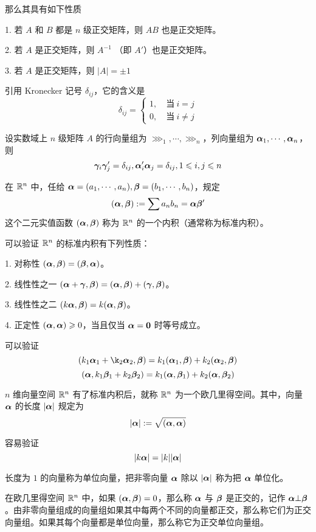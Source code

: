 那么其具有如下性质

1. 若 $A$ 和  $B$ 都是 $n$ 级正交矩阵，则 $AB$ 也是正交矩阵。

2. 若 $A$ 是正交矩阵，则 $A^{-1}$ （即 $A'$）也是正交矩阵。

3. 若 $A$ 是正交矩阵，则 $|A|=\pm 1$


引用 Kronecker 记号 $\delta_{ij}$，它的含义是
$$\delta_{ij}=\begin{cases}
    1,\quad \text{当}\ i=j\\
    0,\quad \text{当}\ i\ne j
\end{cases}$$

\begin{theorem}
    设实数域上 $n$ 级矩阵 $A$ 的行向量组为 $\ggg_1,\cdots,\ggg_n$，列向量组为 $\aaa_1,\cdots,\aaa_n$，则
    $$\ggg_i\ggg_j'=\delta_{ij},\aaa_i'\aaa_j=\delta_{ij},1 \leqslant i,j \leqslant n$$
\end{theorem}

\begin{definition}
    在 $\RR^n$ 中，任给 $\aaa = (a_1,\cdots,a_n),\bbb=(b_1,\cdots,b_n)$，规定
    $$(\aaa,\bbb) := \sum a_nb_n = \aaa\bbb'$$
    这个二元实值函数 $(\aaa,\bbb)$ 称为 $\RR^n$ 的一个内积（通常称为标准内积）。
\end{definition}

可以验证 $\RR^n$ 的标准内积有下列性质：

1. 对称性 $(\aaa,\bbb) = (\bbb,\aaa)$。

2. 线性性之一 $(\aaa+\ggg,\bbb) = (\aaa,\bbb) + (\ggg,\bbb)$。

3. 线性性之二 $(k\aaa,\bbb) = k(\aaa,\bbb)$。

4. 正定性 $(\aaa,\aaa)\geqslant 0$，当且仅当 $\aaa=\ling$ 时等号成立。

可以验证
$$(k_1\aaa_1+\k_2\aaa_2,\bbb) = k_1(\aaa_1,\bbb) + k_2(\aaa_2,\bbb)$$
$$(\aaa,k_1\bbb_1+k_2\bbb_2) = k_1(\aaa,\bbb_1) + k_2(\aaa,\bbb_2)$$

$n$ 维向量空间 $\RR^n$ 有了标准内积后，就称 $\RR^n$ 为一个欧几里得空间。其中，向量 $\aaa$ 的长度 $|\aaa|$ 规定为
$$|\aaa| := \sqrt{(\aaa,\aaa)}$$

容易验证
$$|k\aaa| = |k||\aaa|$$

长度为 $1$ 的向量称为单位向量，把非零向量 $\aaa$ 除以 $|\aaa|$ 称为把 $\aaa$ 单位化。

在欧几里得空间 $\RR^n$ 中，如果 $(\aaa,\bbb)=0$，那么称 $\aaa$ 与 $\bbb$ 是正交的，记作 $\aaa \bot \bbb$。由非零向量组成的向量组如果其中每两个不同的向量都正交，那么称它们为正交向量组。如果其每个向量都是单位向量，那么称它为正交单位向量组。

